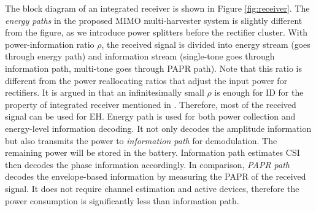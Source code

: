 \documentclass[conference]{IEEEtran}
\begin{document}
The block diagram of an integrated receiver is shown in Figure \ref{fig:receiver}. The \textit{energy paths} in the proposed MIMO multi-harvester system is slightly different from the figure, as we introduce power splitters before the rectifier cluster. With power-information ratio $\rho $, the received signal is divided into energy stream (goes through energy path) and information stream (single-tone goes through information path, multi-tone goes through PAPR path). Note that this ratio is different from the power reallocating ratios that adjust the input power for rectifiers. It is argued in \cite{Park2018} that an infinitesimally small $\rho $ is enough for ID for the property of integrated receiver mentioned in \cite{Zhou2013}. Therefore, most of the received signal can be used for EH. Energy path is used for both power collection and energy-level information decoding. It not only decodes the amplitude information but also transmits the power to \textit{information path} for demodulation. The remaining power will be stored in the battery. Information path estimates CSI then decodes the phase information accordingly. In comparison, \textit{PAPR path} decodes the envelope-based information by measuring the PAPR of the received signal. It does not require channel estimation and active devices, therefore the power consumption is significantly less than information path.
\end{document}
